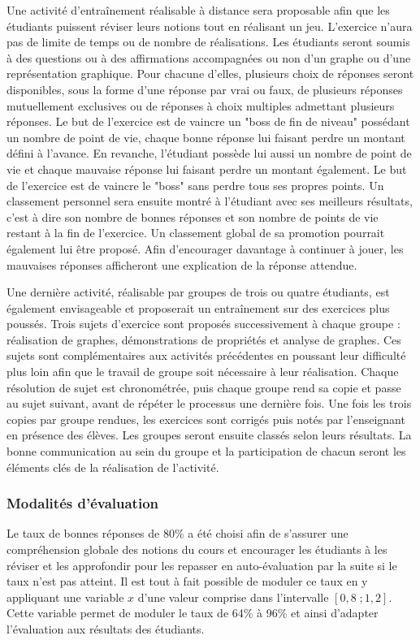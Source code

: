 Une activité d'entraînement réalisable à distance sera proposable afin que les étudiants puissent réviser leurs notions tout en réalisant un jeu. L'exercice n'aura pas de limite de temps ou de nombre de réalisations. Les étudiants seront soumis à des questions ou à des affirmations accompagnées ou non d'un graphe ou d'une représentation graphique. Pour chacune d'elles, plusieurs choix de réponses seront disponibles, sous la forme d'une réponse par vrai ou faux, de plusieurs réponses mutuellement exclusives ou de réponses à choix multiples admettant plusieurs réponses. Le but de l'exercice est de vaincre un "boss de fin de niveau" possédant un nombre de point de vie, chaque bonne réponse lui faisant perdre un montant défini à l'avance. En revanche, l'étudiant possède lui aussi un nombre de point de vie et chaque mauvaise réponse lui faisant perdre un montant également. Le but de l'exercice est de vaincre le "boss" sans perdre tous ses propres points. Un classement personnel sera ensuite montré à l'étudiant avec ses meilleurs résultats, c'est à dire son nombre de bonnes réponses et son nombre de points de vie restant à la fin de l'exercice. Un classement global de sa promotion pourrait également lui être proposé. Afin d'encourager davantage à continuer à jouer, les mauvaises réponses afficheront une explication de la réponse attendue. \par

Une dernière activité, réalisable par groupes de trois ou quatre étudiants, est également envisageable et proposerait un entraînement sur des exercices plus poussés. Trois sujets d'exercice sont proposés successivement à chaque groupe : réalisation de graphes, démonstrations de propriétés et analyse de graphes. Ces sujets sont complémentaires aux activités précédentes en poussant leur difficulté plus loin afin que le travail de groupe soit nécessaire à leur réalisation. Chaque résolution de sujet est chronométrée, puis chaque groupe rend sa copie et passe au sujet suivant, avant de répéter le processus une dernière fois. Une fois les trois copies par groupe rendues, les exercices sont corrigés puis notés par l'enseignant en présence des élèves. Les groupes seront ensuite classés selon leurs résultats. La bonne communication au sein du groupe et la participation de chacun seront les éléments clés de la réalisation de l'activité.

\subsubsection{Modalités d'évaluation}
Le taux de bonnes réponses de 80\% a été choisi afin de s'assurer une compréhension globale des notions du cours et encourager les étudiants à les réviser et les approfondir pour les repasser en auto-évaluation par la suite si le taux n'est pas atteint. Il est tout à fait possible de moduler ce taux en y appliquant une variable $x$ d'une valeur comprise dans l'intervalle $[0,8\;;1,2]$. Cette variable permet de moduler le taux de 64\% à 96\% et ainsi d'adapter l'évaluation aux résultats des étudiants. \par

